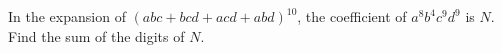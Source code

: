 In the expansion of $(abc+bcd+acd+abd)^{10}$, the coefficient of $a^8b^4c^9d^9$ is $N$. Find the sum of the digits of $N$.
